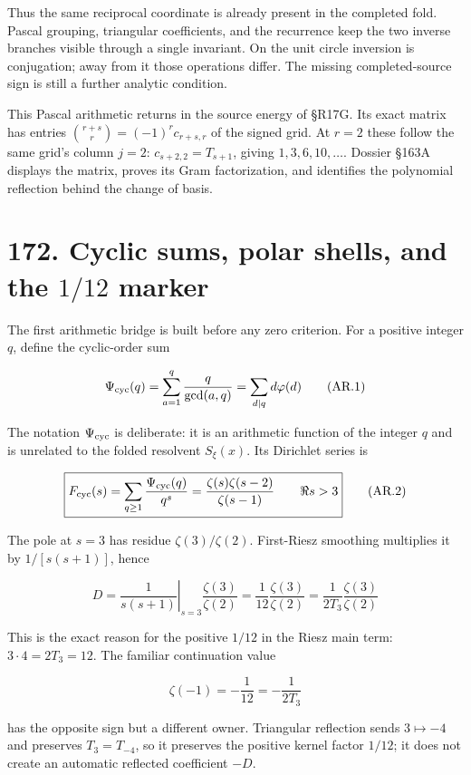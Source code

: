 \documentclass[
  11pt,
]{book}
\begin{document}
Thus the same reciprocal coordinate is already present in the completed
fold. Pascal grouping, triangular coefficients, and the recurrence keep
the two inverse branches visible through a single invariant. On the unit
circle inversion is conjugation; away from it those operations differ.
The missing completed-source sign is still a further analytic condition.

This Pascal arithmetic returns in the source energy of §R17G. Its exact
matrix has entries \(\binom{r+s}{r}=(-1)^r c_{r+s,r}\) of the signed
grid. At \(r=2\) these follow the same grid's column \(j=2\):
\(c_{s+2,2}=T_{s+1}\), giving \(1,3,6,10,\ldots\). Dossier §163A
displays the matrix, proves its Gram factorization, and identifies the
polynomial reflection behind the change of basis.

\section{\texorpdfstring{172. Cyclic sums, polar shells, and the
\(1/12\)
marker}{172. Cyclic sums, polar shells, and the 1/12 marker}}\label{cyclic-sums-polar-shells-and-the-112-marker}

The first arithmetic bridge is built before any zero criterion. For a
positive integer \(q\), define the cyclic-order sum

\[
\Psi_{\rm cyc}(q)
=\sum_{a=1}^{q}\frac{q}{\gcd(a,q)}
=\sum_{d\mid q}d\varphi(d)
\tag{AR.1}
\]

The notation \(\Psi_{\rm cyc}\) is deliberate: it is an arithmetic
function of the integer \(q\) and is unrelated to the folded resolvent
\(S_\xi(x)\). Its Dirichlet series is

\[
\boxed{
F_{\rm cyc}(s)=\sum_{q\ge1}\frac{\Psi_{\rm cyc}(q)}{q^s}
=\frac{\zeta(s)\zeta(s-2)}{\zeta(s-1)}
\qquad \Re s>3}
\tag{AR.2}
\]

The pole at \(s=3\) has residue \(\zeta(3)/\zeta(2)\). First-Riesz
smoothing multiplies it by \(1/[s(s+1)]\), hence

\[
\boxed{
D
=\left.\frac1{s(s+1)}\right|_{s=3}
  \frac{\zeta(3)}{\zeta(2)}
=\frac1{12}\frac{\zeta(3)}{\zeta(2)}
=\frac1{2T_3}\frac{\zeta(3)}{\zeta(2)}}
\tag{AR.3}
\]

This is the exact reason for the positive \(1/12\) in the Riesz main
term: \(3\cdot4=2T_3=12\). The familiar continuation value

\[
\zeta(-1)=-\frac1{12}=-\frac1{2T_3}
\tag{AR.4}
\]

has the opposite sign but a different owner. Triangular reflection sends
\(3\mapsto-4\) and preserves \(T_3=T_{-4}\), so it preserves the
positive kernel factor \(1/12\); it does not create an automatic
reflected coefficient \(-D\).
\end{document}
